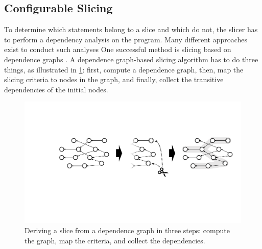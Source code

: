 \subsection{Configurable Slicing}
%
%
%
%
%

To determine which statements belong to a slice and which do not, the slicer has to perform a dependency analysis on the program.
Many different approaches exist to conduct such analyses
\tmpStart
One successful method is slicing based on dependence graphs \cite{korel98:dynamic_program_slicing_methods, tip94:a_survey_of_program}.
A dependence graph-based slicing algorithm has to do three things, as illustrated in \cref{fig:graph-slicing}:
first, compute a dependence graph, then, map the slicing criteria to nodes in the graph, and finally, collect the transitive dependencies of the initial nodes.

\begin{figure}
	\centering
		\includegraphics[width=\linewidth]{img/graph-slicing}
	\caption[Deriving a slice from a dependence graph]{Deriving a slice from a dependence graph in three steps: compute the graph, map the criteria, and collect the dependencies.}
	\label{fig:graph-slicing}
\end{figure}

